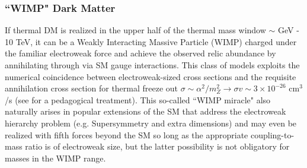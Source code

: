 \subsubsection{``WIMP" Dark Matter}
If thermal DM is realized in the upper half of the thermal mass window $\sim$ GeV - 10 TeV, it can be a Weakly Interacting Massive Particle (WIMP) charged under the 
familiar electroweak force and achieve the observed
relic abundance by annihilating through via SM gauge interactions.  This class of models exploits the numerical
 coincidence between electroweak-sized cross sections and the requisite annihilation cross section for thermal freeze out $\sigma \sim \alpha^2 /m_Z^2  \to \sigma v \sim 3 \times 10^{-26}$ cm$^3$/s (see \cite{Kolb:1990vq} for a pedagogical treatment). This so-called ``WIMP miracle" also naturally arises in popular extensions of the SM that address the electroweak hierarchy problem 
(e.g. Supersymmetry and extra dimensions) and may even be realized with fifth forces beyond the SM so long as the appropriate coupling-to-mass
ratio is of electroweak size, but the latter possibility is not obligatory for masses in the WIMP range.  

